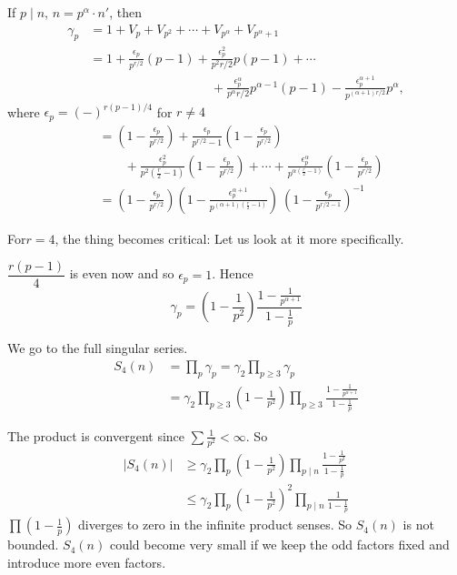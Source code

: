 If $p\mid n$, $n= p^\alpha \cdot n'$, then
\begin{align*}
  \gamma_p & = 1+ V_p + V_{p^2} + \cdots + V_{p^\alpha} +
  V_{p^\alpha+1}\\
  & = 1+ \frac{\epsilon_p}{p^{r/2}} (p-1) + \frac{\epsilon_p^2}{p^2  r/2}
  p(p-1)+ \cdots\\
  & \hspace{4cm}+ \frac{\epsilon_p^\alpha}{p^\alpha r/2} p^{\alpha-1} (p-1)
  - \frac{\epsilon_p^{\alpha+1}}{p^{(\alpha+1) r/2}} p^\alpha,  
\end{align*}
where $\epsilon_p = (-)^{r (p-1)/4}$ for $r\neq 4$
\begin{align*}
  & = \left(1- \frac{\epsilon_p}{p^{r/2}}\right)+ \frac{\epsilon_p}{p^{r/2}-1}
  \left( 1- \frac{\epsilon_p}{p^{r/2}}\right)\\
  & \qquad +
  \frac{\epsilon_p^2}{p^2\left(\frac{r}{2}-1 \right)} \left(1- \frac{\epsilon
    _p}{p^{r/2}}\right)+ \cdots + \frac{\epsilon_p^\alpha}{p^{\alpha
      \left(\frac{r}{2}-1\right) }}
  \left(1-\frac{\epsilon_p}{p^{r/2}}\right)\\
  & = \left(1- \frac{\epsilon_p}{p^{r/2}}\right) \left(1-
  \frac{\epsilon_p^{\alpha+1}}{p^{(\alpha+1)\left(\frac{r}{2}-1\right)
  }}\right) ~\left(1- \frac{\epsilon_p}{p^{r/2-1}}\right)^{-1}
\end{align*}

For\pageoriginale $r=4$, the thing becomes critical: Let us look at
it more specifically.

$\dfrac{r(p-1)}{4}$ is even now and so $\epsilon_p=1$. Hence
$$
\gamma_p = \left(1- \frac{1}{p^2}\right) \frac{1-
  \frac{1}{p^{\alpha+1}}}{1- \frac{1}{p}}
$$ 

We go to the full singular series.
\begin{align*}
  S_4(n) & = \prod_p \gamma_p = \gamma_2 \prod_{p \geq 3} \gamma_p\\
  & = \gamma_2 \prod_{p \geq 3} \left(1- \frac{1}{p^2}\right) \prod_{p
  \geq 3} \frac{1- \frac{1}{p^{\alpha+1}}}{1- \frac{1}{p}}
\end{align*}

The product is convergent since $\sum \frac{1}{p^2} < \infty$. So 
\begin{align*}
  |S_4 (n)| & \geq \gamma_2 \prod_p \left(1- \frac{1}{p^2}\right)
  \prod_{p\mid n} \frac{1-\frac{1}{p^2}}{1- \frac{1}{p}}\\
  & \leq \gamma_2 \prod_p \left(1- \frac{1}{p^2}\right)^2 \prod_{p\mid
    n}  \frac{1}{1- \frac{1}{p}}
\end{align*}
$\prod {\left(1-\frac{1}{p}\right)}$ diverges to zero in the
infinite product senses. So $S_4(n)$ is not bounded. $S_4(n)$ could
become very small if we keep the odd factors fixed and introduce more
even factors.


